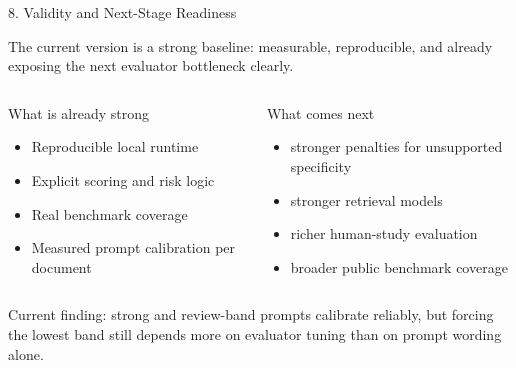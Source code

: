 \documentclass[aspectratio=169,11pt]{beamer}
\newcommand{\slidelead}[1]{%
  {\color{tsmuted}\footnotesize #1\par}
  \vspace{0.35em}
}
\begin{document}
\begin{frame}[shrink=2]{8. Validity and Next-Stage Readiness}
  \slidelead{The current version is a strong baseline: measurable, reproducible, and already exposing the next evaluator bottleneck clearly.}
  \begin{columns}[T,totalwidth=\textwidth]
    \begin{block}{What is already strong}
      \small
      \begin{itemize}
        \item Reproducible local runtime
        \item Explicit scoring and risk logic
        \item Real benchmark coverage
        \item Measured prompt calibration per document
      \end{itemize}
    \end{block}
    \begin{block}{What comes next}
      \small
      \begin{itemize}
        \item stronger penalties for unsupported specificity
        \item stronger retrieval models
        \item richer human-study evaluation
        \item broader public benchmark coverage
      \end{itemize}
    \end{block}
  \end{columns}
\vspace{0.2em}
{\scriptsize\color{tsmuted}Current finding: strong and review-band prompts calibrate reliably, but forcing the lowest band still depends more on evaluator tuning than on prompt wording alone.}
\vspace{0.35em}
\begin{center}
\end{center}
\end{frame}
\end{document}
